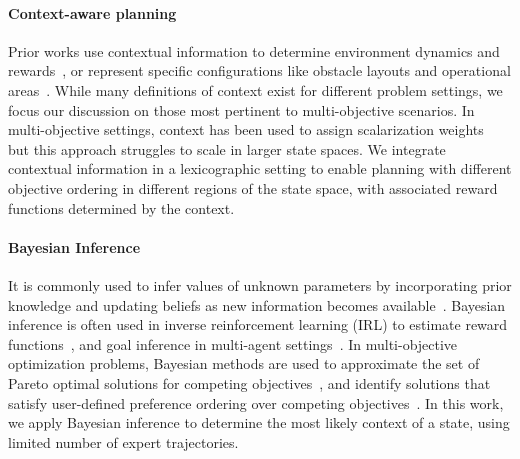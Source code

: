 \paragraph{Context-aware planning} 
Prior works use contextual information to determine environment dynamics and rewards~\cite{benjamins2022contextualize,kim2023context,modi2018markov}, or represent specific configurations like obstacle layouts and operational areas~\cite{bahrani2008collaborative,hvvezda2018context,ter2010context}. While many definitions of context exist for different problem settings, we focus our discussion on those most pertinent to multi-objective scenarios. In multi-objective settings, context has been used to assign scalarization weights~\cite{yang2019generalized} but this approach struggles to scale in larger state spaces. We integrate contextual information in a lexicographic setting to enable planning with different objective ordering in different regions of the state space, with associated reward functions determined by the context. 

\paragraph{Bayesian Inference} It is commonly used to infer values of unknown parameters by incorporating prior knowledge and updating beliefs as new information becomes available~\cite{belakaria2020uncertainty,zhi2020online,abdolshah2019multi}.
Bayesian inference is often used in 
inverse reinforcement learning (IRL) to estimate reward functions~\cite{ramachandran2007bayesian,pmlr-v119-brown20a}, and goal inference in multi-agent settings~\cite{ullman2009help,zhi2020online}. In multi-objective optimization problems, Bayesian methods are used to approximate the set of Pareto optimal solutions for competing objectives~\cite{belakaria2020uncertainty,pmlr-v162-daulton22a}, and identify solutions that satisfy user-defined preference ordering over competing objectives~\cite{abdolshah2019multi}.
In this work, we apply Bayesian inference to determine the most likely context of a state, using limited number of expert trajectories.

